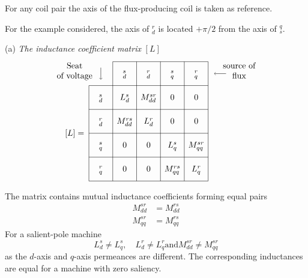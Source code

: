 \documentclass[a4paper,numbers=noenddot,12pt]{scrbook}
\begin{document}
For any coil pair the axis of the flux-producing coil is taken as reference.

For the example considered, the axis of $_d^r$ is located $+\pi/2$ from the axis of $_s^q$.

\vspace{2em}

\noindent (a) \emph{The inductance coefficient matrix} $[L]$
\begin{equation}
    \begin{tikzpicture} [anchor = base, baseline =0pt]
        \draw (0,0)--(5,0) (0,1)--(5,1) (0,2)--(5,2) (1,3)--(5,3) (0,-1)--(5,-1) (0,-2)--(5,-2);
        \draw (0,-2)--(0,2) (1,-2)--(1,3) (2,-2)--(2,3) (3,-2)--(3,3) (4,-2)--(4,3) (5,-2)--(5,3);
        \draw (0.5,-1.6) node{$_q^r$} +(0,1) node{$_q^s$} +(0,2) node{$_d^r$} +(0,3) node{$_d^s$};
        \draw (1.5,-1.6) node{0} +(0,1) node{0} +(0,2) node{$M_{dd}^{rs}$} +(0,3) node{$L_d^s$}+(0,4) node{$_d^s$};
        \draw (2.5,-1.6) node{0} +(0,1) node{0} +(0,2) node{$L_{d}^{r}$} +(0,3) node{$M_{dd}^{sr}$}+(0,4) node{$_d^r$};
        \draw (3.5,-1.6) node{$M_{qq}^{rs}$} +(0,1) node{$L_q^s$} +(0,2) node{0} +(0,3) node{0}+(0,4) node{$_q^s$};
        \draw (4.5,-1.6) node{$L_q^r$} +(0,1) node{$M_{qq}^{sr}$} +(0,2) node{0} +(0,3) node{0}+(0,4) node{$_q^r$};
        \draw (-0.6,-0.1) node{$[L] =$};
        \draw [align = center,->](-0.6, 2.3) node{Seat\\of voltage} (0.5,2.75)--(0.5, 2.25);
        \draw [align = center,->](6.3, 2.3) node{source of\\flux} (5.75,2.5)--(5.25,2.5);
    \end{tikzpicture}
\end{equation}

The matrix contains mutual inductance coefficients forming equal pairs
\begin{align*}
    M_{dd}^{sr} & = M_{dd}^{rs} \\
    M_{qq}^{sr} & = M_{qq}^{rs}
\end{align*}
For a salient-pole machine
\begin{equation*}
    L_d^s \neq L_q^s , \quad L_d^r \neq L_q^r \text{and} M_{dd}^{sr} \neq M_{qq}^{sr}
\end{equation*}
as the $d$-axis and $q$-axis permeances are different. The corresponding inductances are equal for a machine with zero saliency.

\vspace{2em}
\end{document}
